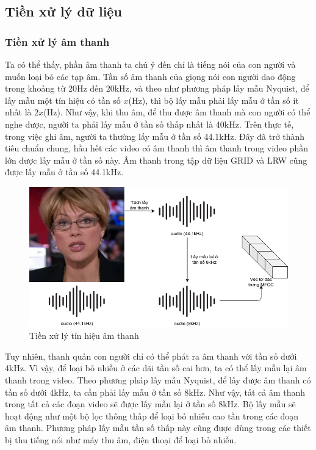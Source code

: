 \subsection{Tiền xử lý dữ liệu}

\subsubsection{Tiền xử lý âm thanh}
Ta có thể thấy, phần âm thanh ta chú ý đến chỉ là tiếng nói của con người và muốn loại bỏ các tạp âm. Tần số âm thanh của giọng nói con người dao động trong khoảng từ 20Hz đến 20kHz, và theo như phương pháp lấy mẫu Nyquist, để lấy mẫu một tín hiệu có tần số $x$(Hz), thì bộ lấy mẫu phải lấy mẫu ở tần số ít nhất là $2x$(Hz). Như vậy, khi thu âm, để thu được âm thanh mà con người có thể nghe được, người ta phải lấy mẫu ở tần số thấp nhất là 40kHz. Trên thực tế, trong việc ghi âm, người ta thường lấy mẫu ở tần số 44.1kHz. Đây đã trở thành tiêu chuẩn chung, hầu hết các video có âm thanh thì âm thanh trong video phần lớn được lấy mẫu ở tần số này. Âm thanh trong tập dữ liệu GRID và LRW cũng được lấy mẫu ở tần số 44.1kHz.

\begin{figure}[H]
    \centering
    \includegraphics[width=12cm]{./content/materials/preprocess-audio.png}
    \caption{Tiền xử lý tín hiệu âm thanh}
\end{figure}

Tuy nhiên, thanh quản con người chỉ có thể phát ra âm thanh với tần số dưới 4kHz. Vì vậy, để loại bỏ nhiễu ở các dãi tần số cai hơn, ta có thể lấy mẫu lại âm thanh trong video. Theo phương pháp lấy mẫu Nyquist, để lấy được âm thanh có tần số dưới 4kHz, ta cần phải lấy mẫu ở tần số 8kHz. Như vậy, tất cả âm thanh trong tất cả các đoạn video sẽ được lấy mẫu lại ở tần số 8kHz. Bộ lấy mẫu sẽ hoạt động như một bộ lọc thông thấp để loại bỏ nhiễu cao tần trong các đoạn âm thanh. Phương pháp lấy mẫu tần số thấp này cũng được dùng trong các thiết bị thu tiếng nói như máy thu âm, điện thoại để loại bỏ nhiễu.

